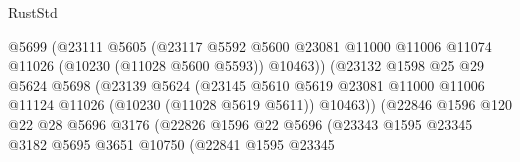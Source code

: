 \begin{lexlean}{RustStd}
\begin{coremodule}
                                      @5699
                                      (@23111
                                        @5605
                                        (@23117
                                          @5592
                                          @5600
                                          @23081
                                          @11000
                                          @11006
                                          @11074
                                          @11026
                                          (@10230 (@11028 @5600 @5593))
                                          @10463))
                                      (@23132
                                        @1598
                                        @25
                                        @29
                                        @5624
                                        @5698
                                        (@23139
                                          @5624
                                          (@23145
                                            @5610
                                            @5619
                                            @23081
                                            @11000
                                            @11006
                                            @11124
                                            @11026
                                            (@10230 (@11028 @5619 @5611))
                                            @10463))
                                        (@22846
                                          @1596
                                          @120
                                          @22
                                          @28
                                          @5696
                                          @3176
                                          (@22826
                                            @1596
                                            @22
                                            @5696
                                            (@23343
                                              @1595
                                              @23345
                                              @3182
                                              @5695
                                              @3651
                                              @10750
                                              (@22841
                                                @1595
                                                @23345

\end{coremodule}
\end{lexlean}
